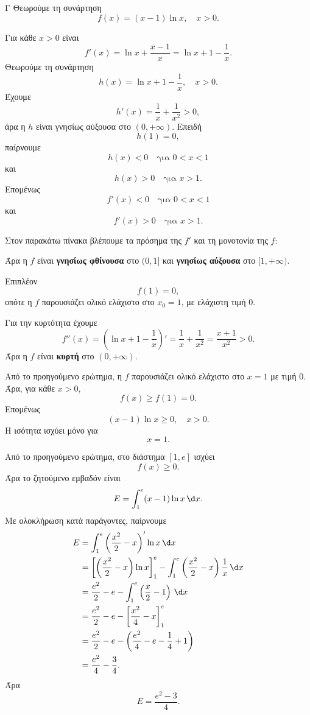 \begin{thema}{Γ}
Θεωρούμε τη συνάρτηση
\[
f(x)=(x-1)\ln x,\quad x>0.
\]
\begin{erwthma}
\item Για κάθε $x>0$ είναι
\[
f'(x)=\ln x+\frac{x-1}{x}
=\ln x+1-\frac{1}{x}.
\]
Θεωρούμε τη συνάρτηση
\[
h(x)=\ln x+1-\frac{1}{x},\quad x>0.
\]
Έχουμε
\[
h'(x)=\frac{1}{x}+\frac{1}{x^2}>0,
\]
άρα η $h$ είναι γνησίως αύξουσα στο $(0,+\infty)$. Επειδή
\[
h(1)=0,
\]
παίρνουμε
\[
h(x)<0\quad\text{για }0<x<1
\]
και
\[
h(x)>0\quad\text{για }x>1.
\]
Επομένως
\[
f'(x)<0\quad\text{για }0<x<1
\]
και
\[
f'(x)>0\quad\text{για }x>1.
\]

Στον παρακάτω πίνακα βλέπουμε τα πρόσημα της $f'$ και τη μονοτονία της $f$:
\begin{center}
\end{center}
Άρα η $f$ είναι \textbf{γνησίως φθίνουσα} στο $(0,1]$ και \textbf{γνησίως αύξουσα} στο $[1,+\infty)$.

Επιπλέον
\[
f(1)=0,
\]
οπότε η $f$ παρουσιάζει ολικό ελάχιστο στο $x_0=1$, με ελάχιστη τιμή $0$.

Για την κυρτότητα έχουμε
\[
f''(x)=\left(\ln x+1-\frac{1}{x}\right)'
=\frac{1}{x}+\frac{1}{x^2}
=\frac{x+1}{x^2}>0.
\]
Άρα η $f$ είναι \textbf{κυρτή} στο $(0,+\infty)$.

\item Από το προηγούμενο ερώτημα, η $f$ παρουσιάζει ολικό ελάχιστο στο $x=1$ με τιμή $0$. Άρα, για κάθε $x>0$,
\[
f(x)\geq f(1)=0.
\]
Επομένως
\[
{(x-1)\ln x\geq0,\quad x>0}.
\]
Η ισότητα ισχύει μόνο για
\[
{x=1}.
\]

\item Από το προηγούμενο ερώτημα, στο διάστημα $[1,e]$ ισχύει
\[
f(x)\geq0.
\]
Άρα το ζητούμενο εμβαδόν είναι
\[
E=\dint_1^e (x-1)\ln x\,\d x.
\]
Με ολοκλήρωση κατά παράγοντες, παίρνουμε
\begin{align*}
E&=\dint_1^e \left(\frac{x^2}{2}-x\right)'\ln x\,\d x\\
&=\left[\left(\frac{x^2}{2}-x\right)\ln x\right]_1^e
-\dint_1^e\left(\frac{x^2}{2}-x\right)\frac{1}{x}\,\d x\\
&=\frac{e^2}{2}-e-\dint_1^e\left(\frac{x}{2}-1\right)\,\d x\\
&=\frac{e^2}{2}-e-\left[\frac{x^2}{4}-x\right]_1^e\\
&=\frac{e^2}{2}-e-\left(\frac{e^2}{4}-e-\frac{1}{4}+1\right)\\
&=\frac{e^2}{4}-\frac{3}{4}.
\end{align*}
Άρα
\[
{E=\frac{e^2-3}{4}}.
\]


\end{erwthma}
\end{thema}
